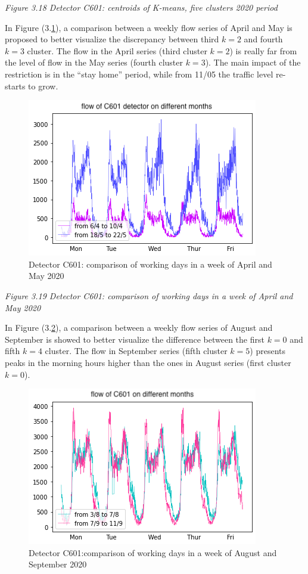 \documentclass[11pt]{article}
\begin{document}
\emph{\small Figure 3.18 Detector C601: centroids of K-means, five clusters 2020 period}

    In Figure (3.\ref{fig:3.19}), a comparison between a weekly flow series
of April and May is proposed to better visualize the discrepancy between
third \(k=2\) and fourth \(k=3\) cluster. The flow in the April series
(third cluster \(k=2\)) is really far from the level of flow in the May
series (fourth cluster \(k=3\)). The main impact of the restriction is
in the ``stay home'' period, while from 11/05 the traffic level
re-starts to grow.

    \begin{figure}
    \centering
    \includegraphics[scale=0.5]{C601 april vs may 2020.png}
    \caption{Detector C601: comparison of working days in a week of April and May 2020}
    \label{fig:3.19}
\end{figure}

\emph{\small Figure 3.19 Detector C601: comparison of working days in a week of April and May 2020}

    In Figure (3.\ref{fig:3.20}), a comparison between a weekly flow series
of August and September is showed to better visualize the difference
between the first \(k=0\) and fifth \(k=4\) cluster. The flow in
September series (fifth cluster \(k=5\)) presents peaks in the morning
hours higher than the ones in August series (first cluster \(k=0\)).

    \begin{figure}
    \centering
    \includegraphics[scale=0.5]{C601 august vs september .png}
    \caption{Detector C601:comparison of working days in a week of August and September 2020}
    \label{fig:3.20}
\end{figure}
\end{document}
